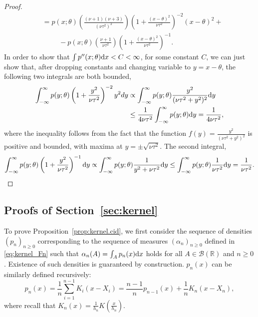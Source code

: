 \documentclass{article}
\theoremstyle{definition}
\newcommand{\red}[1]{\textcolor{red}{#1}}
\newcommand{\di}{{\rm d}}
\renewcommand{\&}{and}
\begin{document}
\begin{proof}
\begin{align*}
& =  p(x;\theta) \left(\frac{(\nu+1)(\nu+3)}{(\nu \tau^2)^{2}}\right)\left(1 + \frac{(x - \theta)^2}{\nu \tau^2} \right)^{-2} (x-\theta)^{2} +\\
& \hspace{1cm} - p(x;\theta) \left(\frac{\nu+1}{\nu \tau^{2}}\right)   \left( 1 + \frac{(x - \theta)^2}{\nu \tau^2} \right)^{-1}.
\end{align*}
In order to show that $\int p''(x;\theta) \di x < C < \infty$, for some constant $C$, we can just show that, after dropping constants and changing variable to $y=x-\theta$, the following two integrals are both bounded, 
\begin{align*}
  \int_{-\infty}^{\infty}   p(y;\theta) \left(1 + \frac{y^2}{\nu \tau^2} \right)^{-2} y^{2} dy & \propto \int_{-\infty}^{\infty}   p(y;\theta) \frac{y^{2}}{(\nu \tau^2 +y^{2})^{2}} \di y \\
  &\leq \frac{1}{4\nu \tau^{2}}\int_{-\infty}^{\infty}   p(y;\theta)  \di y = \frac{1}{4\nu \tau^{2}},
\end{align*}
where the inequality follows from the fact that the function $f(y) =\frac{y^{2}}{(\nu \tau^2 +y^{2})^{2}}$ is positive and bounded, with maxima at $y=\pm\sqrt{\nu \tau^2}$. The second integral,
\begin{align*}
    \int_{-\infty}^{\infty}  p(y;\theta)    \left( 1 + \frac{y^2}{\nu \tau^2} \right)^{-1}  \di y \propto \int_{-\infty}^{\infty}   p(y;\theta)     \frac{1}{y^2+ \nu \tau^2}   \di y \leq   \int_{-\infty}^{\infty}   p(y;\theta) \frac{1}{\nu \tau^2}       \di y = \frac{1}{\nu \tau^2}.
\end{align*} 
\end{proof}

\subsection{Proofs of Section~\ref{sec:kernel}}

To prove Proposition~\ref{prop:kernel.cid}, we first consider the sequence of densities $(p_n)_{n\geq 0}$ corresponding to the sequence of measures $(\alpha_n)_{n \geq 0}$ defined in \eqref{eq:kernel_Fn} such that $\alpha_n(A) =\int_A p_n(x) \di x$ holds for all $A\in \mathcal{B}(\mathbb{R})$ and $n\geq 0$.  Existence of such densities is guaranteed by construction. $p_n(x)$ can be similarly defined recursively: 
\begin{equation} \label{eq:kernel_densities}
p_{n}(x)=\frac{1}{n}\sum_{i=1}^{n-1} K_i(x-X_i) =\frac{n-1}{n}p_{n-1}(x)+\frac{1}{n} K_n(x-X_{n}),
\end{equation}
where recall that $K_n(x)=\frac{1}{h_n}K(\frac{x}{h_n})$. %
\end{document}
